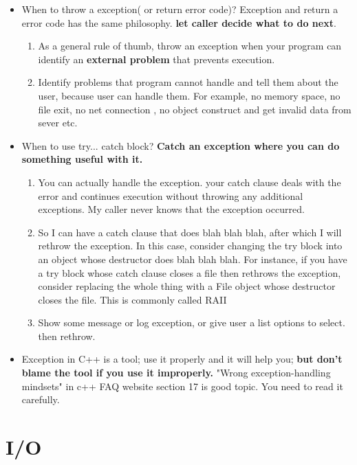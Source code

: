 \documentclass[a4paper,11pt,twoside]{book}
\begin{document}
\begin{itemize}
	\item When to throw a exception( or return error code)? Exception and return a error code has the same philosophy. \textbf{let caller decide what to do next}.

	\begin{enumerate}
		\item As a general rule of thumb, throw an exception when your program can identify an \textbf{external problem} that prevents execution.
		\item Identify problems that program cannot handle and tell them about the user, because user can handle them. For example, no memory space, no file exit, no net connection , no object construct and get invalid data from sever etc.
	\end{enumerate}
	
	\item When to use try... catch block? \textbf{Catch an exception where you can do something useful with it.}

	\begin{enumerate}
		\item You can actually handle the exception. your catch clause deals with the error and continues execution without throwing any additional exceptions. My caller never knows that the exception occurred.
		
		\item So I can have a catch clause that does blah blah blah, after which I will rethrow the exception. In this case, consider changing the try block into an object whose destructor does blah blah blah. For instance, if you have a try block whose catch clause closes a file then rethrows the exception, consider replacing the whole thing with a File object whose destructor closes the file. This is commonly called RAII
		
		\item Show some message or log exception, or give user a list options to select.  then rethrow.
	\end{enumerate}
		
	
	\item Exception in C++ is a tool; use it properly and it will help you; \textbf{but don't blame the tool if you use it improperly.} "Wrong exception-handling mindsets" in c++ FAQ website section 17 is good topic. You need to read it carefully.
	
\end{itemize}


\chapter{I/O}
\end{document}
